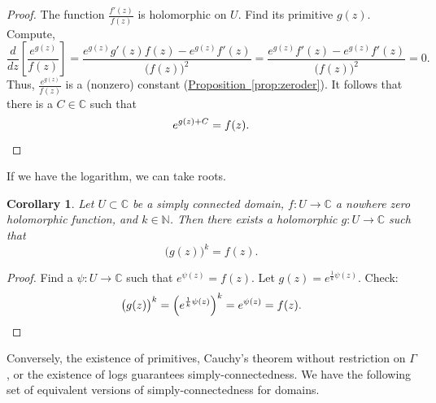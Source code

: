\documentclass[12pt,openany]{book}
\newcommand{\C}{{\mathbb{C}}}
\newcommand{\N}{{\mathbb{N}}}
\theoremstyle{plain}
\newtheorem{cor}[thm]{Corollary}
\theoremstyle{remark}
\theoremstyle{definition}
\theoremstyle{exercise}
\theoremstyle{example}
\newcommand{\propref}[1]{\hyperref[#1]{Proposition~\ref*{#1}}}
\begin{document}
\begin{proof}
The function $\frac{f'(z)}{f(z)}$ is holomorphic on $U$.
Find its primitive $g(z)$.  Compute,
\begin{equation*}
\frac{d}{dz} \left[ \frac{e^{g(z)}}{f(z)} \right] =
\frac{ e^{g(z)} g'(z) f(z) - e^{g(z)} f'(z) }{{\bigl(f(z)\bigr)}^2}
=
\frac{ e^{g(z)} f'(z) - e^{g(z)} f'(z) }{{\bigl(f(z)\bigr)}^2}
=
0 .
\end{equation*}
Thus, $\frac{e^{g(z)}}{f(z)}$ is a (nonzero) constant
(\propref{prop:zeroder}).  It follows that
there is a $C \in \C$ such that
\begin{equation*}
e^{g(z) + C} = f(z) .
\qedhere
\end{equation*}
\end{proof}

If we have the logarithm, we can take roots.

\begin{cor}
Let $U \subset \C$ be a simply connected domain,
$f \colon U \to \C$ a nowhere zero holomorphic
function, and $k \in \N$.
Then there exists a holomorphic $g \colon U \to \C$
such that
\begin{equation*}
{\bigl(g(z)\bigr)}^k = f(z) .
\end{equation*}
\end{cor}

\begin{proof}
Find a $\psi \colon U \to \C$ such that $e^{\psi(z)} = f(z)$.  Let
$g(z) = e^{\frac{1}{k} \psi(z)}$.  Check:
\begin{equation*}
{\bigl(g(z)\bigr)}^k
=
{\left( e^{\frac{1}{k} \psi(z)} \right)}^k
=
e^{\psi(z)} = f(z) . \qedhere
\end{equation*}
\end{proof}

Conversely, the existence of primitives,
Cauchy's theorem without restriction on $\Gamma$, or the existence of logs guarantees
simply-connectedness.  We have the following set of equivalent
versions of simply-connectedness for domains.
\end{document}
